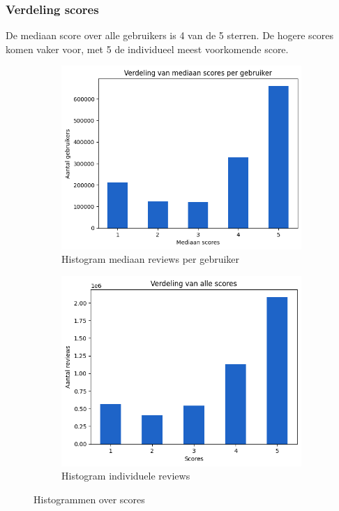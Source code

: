 \subsubsection{Verdeling scores}
De mediaan score over alle gebruikers is 4 van de 5 sterren. De hogere scores komen vaker voor, met 5 de individueel meest voorkomende score.
\begin{figure}[H]
    \begin{subfigure}{.5\textwidth}
        \centering
        \includegraphics[width=1\linewidth]{fig/chapt3/verdeling_mediaan_scores_per_gebruiker.png}
        \caption{Histogram mediaan reviews per gebruiker}
        \label{fig:chapt3_verdeling_mediaan_scores_per_gebruiker}
    \end{subfigure}
    \begin{subfigure}{.5\textwidth}
        \centering
        \includegraphics[width=1\linewidth]{fig/chapt3/verdeling_alle_scores.png}
        \caption{Histogram individuele reviews}
        \label{fig:chapt3_verdeling_alle_scores}
    \end{subfigure}
    \caption{Histogrammen over scores}
\end{figure}
